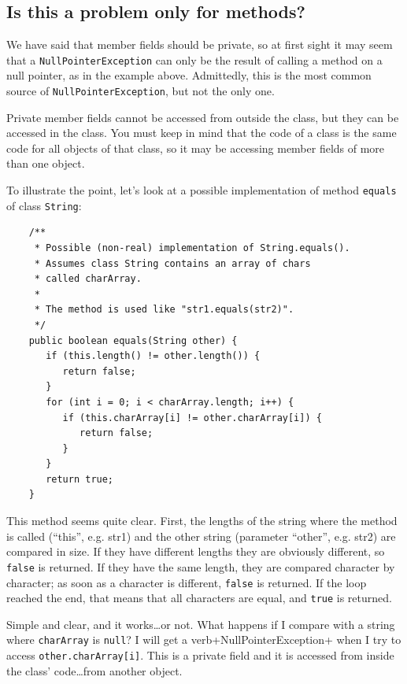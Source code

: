 \subsection{Is this a problem only for methods?}
\label{sec:this-problem-only}

We have said that member fields should be private, so at first sight
it may seem that a \verb+NullPointerException+ can only be the result
of calling a method on a null pointer, as in the example
above. Admittedly, this is the most common source of
\verb+NullPointerException+, but not the only one. 

Private member fields cannot be accessed from outside the class, but
they can be accessed in the class. You must keep in mind that the code
of a class is the same code for all objects of that class, so it may
be accessing member fields of more than one object. 

To illustrate the point, let's look at a possible implementation of
method \verb+equals+ of class \verb+String+: 

\begin{verbatim}
    /** 
     * Possible (non-real) implementation of String.equals().
     * Assumes class String contains an array of chars
     * called charArray.
     * 
     * The method is used like "str1.equals(str2)".
     */
    public boolean equals(String other) {
       if (this.length() != other.length()) {
          return false;
       }
       for (int i = 0; i < charArray.length; i++) {
          if (this.charArray[i] != other.charArray[i]) {
             return false;
          }
       } 
       return true;
    }
\end{verbatim}

This method seems quite clear. First, the lengths of the string where
the method is called 
(``this'', e.g. str1) and the other string (parameter ``other'',
e.g. str2) are compared in size. If they have different lengths they
are obviously different, so \verb+false+ is returned. If they have the
same length, they are compared character by character; as soon as a
character is different, \verb+false+ is returned. If the loop reached
the end, that means that all characters are equal, and \verb+true+ is
returned. 

Simple and clear, and it works\ldots or not. What happens if I compare
with a string where \verb+charArray+ is \verb+null+? I will get a
verb+NullPointerException+ when I try to access
\verb+other.charArray[i]+. This is a private field and it is accessed
from inside the class' code\ldots from another object. 

